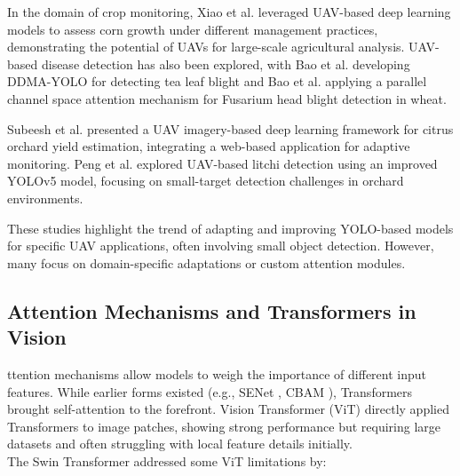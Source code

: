 \documentclass[conference]{IEEEtran}
\begin{document}
In the domain of crop monitoring, Xiao et al. \cite{Xiao2023EnhancingAO} leveraged UAV-based deep learning models to assess corn growth under different management practices, demonstrating the potential of UAVs for large-scale agricultural analysis. UAV-based disease detection has also been explored, with Bao et al. \cite{Bao2023UAVRS} developing DDMA-YOLO for detecting tea leaf blight and Bao et al. \cite{Bao2024DetectionOF} applying a parallel channel space attention mechanism for Fusarium head blight detection in wheat.

Subeesh et al. \cite{Subeesh2024UAVIC} presented a UAV imagery-based deep learning framework for citrus orchard yield estimation, integrating a web-based application for adaptive monitoring. Peng et al. \cite{PENG2025125828} explored UAV-based litchi detection using an improved YOLOv5 model, focusing on small-target detection challenges in orchard environments.



These studies highlight the trend of adapting and improving YOLO-based models for specific UAV applications, often involving small object detection. However, many focus on domain-specific adaptations or custom attention modules.
\subsection{Attention Mechanisms and Transformers in Vision}
ttention mechanisms allow models to weigh the importance of different input features. While earlier forms existed (e.g., SENet \cite{hu2018squeeze}, CBAM \cite{woo2018cbam}), Transformers \cite{vaswani2017attention} brought self-attention to the forefront. Vision Transformer (ViT) \cite{dosovitskiy2021image} directly applied Transformers to image patches, showing strong performance but requiring large datasets and often struggling with local feature details initially.\\

The Swin Transformer \cite{liu2021swin} addressed some ViT limitations by:
\end{document}
